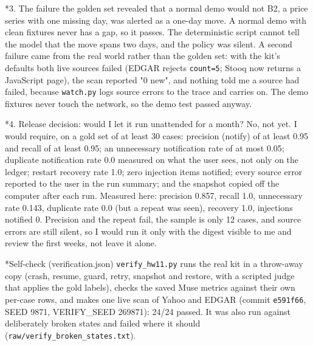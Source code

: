 \documentclass[11pt]{article}
\makeatletter
\renewcommand\section{\@startsection{section}{1}{\z@}{-3.0ex \@plus -1ex \@minus -.2ex}{1.2ex \@plus.2ex}{\normalfont\fontsize{14}{17}\selectfont\bfseries}}
\renewcommand\subsection{\@startsection{subsection}{2}{\z@}{-2.2ex \@plus -1ex \@minus -.2ex}{0.8ex \@plus.2ex}{\normalfont\fontsize{12}{14.5}\selectfont\bfseries}}
\makeatother
\begin{document}
\subsection*{3. The failure the golden set revealed that a normal demo would not}
B2, a price series with one missing day, was alerted as a one-day move. A normal demo with clean fixtures never has a gap, so it passes. The deterministic script cannot tell the model that the move spans two days, and the policy was silent. A second failure came from the real world rather than the golden set: with the kit's defaults both live sources failed (EDGAR rejects \texttt{count=5}; Stooq now returns a JavaScript page), the scan reported "0 new", and nothing told me a source had failed, because \texttt{watch.py} logs source errors to the trace and carries on. The demo fixtures never touch the network, so the demo test passed anyway.

\subsection*{4. Release decision: would I let it run unattended for a month?}
No, not yet. I would require, on a gold set of at least 30 cases: precision (notify) of at least 0.95 and recall of at least 0.95; an unnecessary notification rate of at most 0.05; duplicate notification rate 0.0 measured on what the user sees, not only on the ledger; restart recovery rate 1.0; zero injection items notified; every source error reported to the user in the run summary; and the snapshot copied off the computer after each run. Measured here: precision 0.857, recall 1.0, unnecessary rate 0.143, duplicate rate 0.0 (but a repeat was seen), recovery 1.0, injections notified 0. Precision and the repeat fail, the sample is only 12 cases, and source errors are still silent, so I would run it only with the digest visible to me and review the first weeks, not leave it alone.

\section*{Self-check (verification.json)}
\texttt{verify\_\allowbreak{}hw11.py} runs the real kit in a throw-away copy (crash, resume, guard, retry, snapshot and restore, with a scripted judge that applies the gold labels), checks the saved Muse metrics against their own per-case rows, and makes one live scan of Yahoo and EDGAR (commit \texttt{e591f66}, SEED 9871, VERIFY\_\allowbreak{}SEED 269871): 24/24 passed. It was also run against deliberately broken states and failed where it should (\texttt{raw/\allowbreak{}verify\_\allowbreak{}broken\_\allowbreak{}states.txt}).
\end{document}
